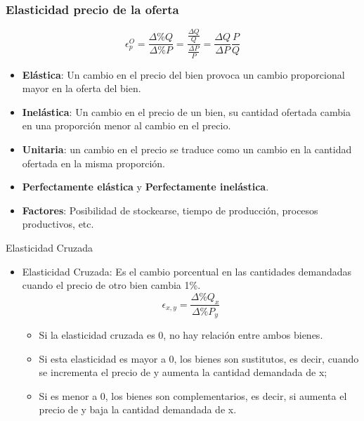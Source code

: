 \documentclass{beamer}
\begin{document}
\begin{frame}
\frametitle{Elasticidad precio de la oferta}
    \begin{equation*}
      \epsilon^{O}_p = \frac{\Delta \% Q}{\Delta \% P} = \frac{\frac{\Delta Q}{Q}}{\frac{\Delta P}{P}} = \frac{\Delta Q}{\Delta P} \frac{P}{Q}
    \end{equation*}
    \begin{itemize}
      \item \textbf{Elástica}: Un cambio en el precio del bien provoca un cambio
      proporcional mayor en la oferta del bien.
      \item \textbf{Inelástica}: Un cambio en el precio de un bien, su
      cantidad ofertada cambia en una proporción menor al cambio en
      el precio.
      \item \textbf{Unitaria}: un cambio en el precio se traduce como un cambio en la
      cantidad ofertada en la misma proporción.
      \item \textbf{Perfectamente elástica} y \textbf{Perfectamente inelástica}.
      \item \textbf{Factores}: Posibilidad de stockearse, tiempo de producción, procesos productivos, etc.    
    \end{itemize}
\end{frame}

\begin{frame}{Elasticidad Cruzada}
  \begin{itemize}
    \item Elasticidad Cruzada: Es el cambio porcentual en las cantidades demandadas cuando el precio de otro bien cambia 1\%.
    \begin{equation*}
      \epsilon_{x,y} = \frac{\Delta \% Q_x}{\Delta \% P_y}
    \end{equation*}
    \begin{itemize}
        \item Si la elasticidad cruzada es 0, no hay relación entre ambos bienes.
        \item Si esta elasticidad es mayor a 0, los bienes son sustitutos, es decir, cuando se incrementa el precio de y aumenta la cantidad demandada de x; 
        \item Si es menor a 0, los bienes son complementarios, es decir, si aumenta el precio de y baja la cantidad demandada de x.
    \end{itemize}
  \end{itemize}
\end{frame}
\end{document}
